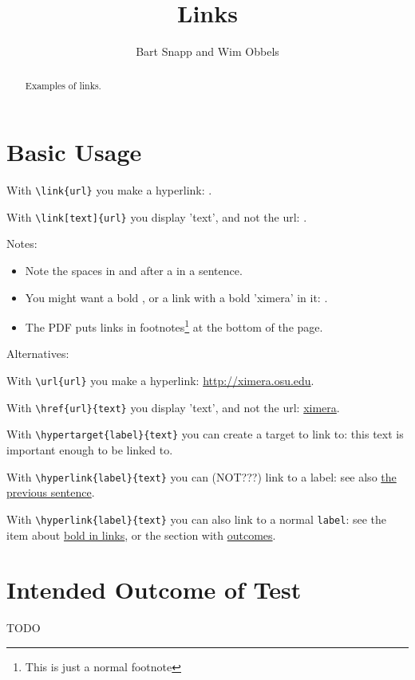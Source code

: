 \documentclass{ximera}
\title{Links}
\author{Bart Snapp and Wim Obbels}
\begin{document}
\begin{abstract}
  Examples of links.
\end{abstract}
\maketitle

\section*{Basic Usage}\label{sec:link:basicUsage}

With \verb|\link{url}| you make a hyperlink: .

With \verb|\link[text]{url}| you display 'text', and not the url: .



Notes: 
\begin{itemize}
 \item \label{link_spaces}   Note the spaces in and after a  in a sentence.
 \item \label{link_bold}     You might want a bold \textbf{}, or a link with a bold 'ximera' in it: .
 \item \label{link_footnote} The PDF puts links in footnotes\footnote{This is just a normal footnote} at the bottom of the page.
\end{itemize}

Alternatives:

With \verb|\url{url}| you make a hyperlink: \url{http://ximera.osu.edu}.

With \verb|\href{url}{text}| you display 'text', and not the url: \href{http://ximera.osu.edu}{ximera}.

With \verb|\hypertarget{label}{text}| you can create a target to link to: \hypertarget{ht_bold}{this text is important enough to be linked to}.

With \verb|\hyperlink{label}{text}| you can (NOT???) link to a label: see also \hyperlink{ht_bold}{the previous sentence}.

With \verb|\hyperlink{label}{text}| you can also link to a normal \verb|label|: see the item about \hyperlink{link_bold}{bold in links}, or the section with \hyperref[sec:link:intendedOutcome]{outcomes}.

\section*{Intended Outcome of Test}\label{sec:link:intendedOutcome}

TODO


\end{document}
